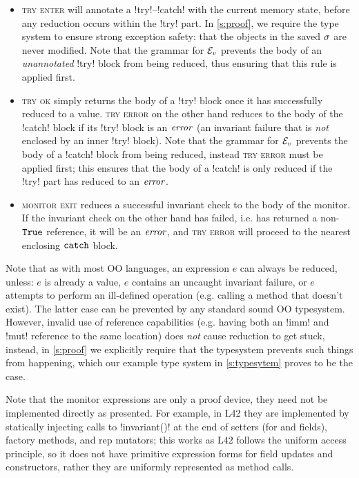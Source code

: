 \begin{itemize}
\item \textsc{try enter} will annotate a \Q!try!--\Q!catch! with the current memory state, before any reduction occurs within the \Q!try! part. In \ref{s:proof}, we require the type system to ensure strong exception safety: that the objects in the saved $\sigma$ are never modified. Note that the grammar for $\mathcal{E}_v{}$ prevents the body of an \emph{unannotated} \Q!try! block from being reduced, thus ensuring that this rule is applied first.

\item \textsc{try ok} simply returns the body of a \Q!try! block once it has successfully reduced to a value. \textsc{try error} on the other hand reduces to the body of the \Q!catch! block if its \Q!try! block is an $\mathit{error}$ (an invariant failure that is \emph{not} enclosed by an inner \Q!try! block). Note that the grammar for $\mathcal{E}_v{}$ prevents the body of a \Q!catch! block from being reduced, instead \textsc{try error} must be applied first; this ensures that the body of a \Q!catch! is only reduced if the \Q!try! part has reduced to an $\mathit{error}$.

\item \textsc{monitor exit} reduces a successful invariant check to the body of the monitor. If the invariant check on the other hand has failed, i.e. has returned a non-$\texttt{True}$ reference, it will be an $\mathit{error}$, and \textsc{try error} will proceed to the nearest enclosing $\texttt{catch}$ block.
\end{itemize}

Note that as with most OO languages, an expression $e$ can always be reduced, unless: $e$ is already a value, $e$ contains an uncaught invariant failure, or $e$ attempts to perform an ill-defined operation (e.g. calling a method that doesn't exist). The latter case can be prevented by any standard sound OO typesystem.
However, invalid use of reference capabilities (e.g. having both an \Q!imm! and \Q!mut! reference to the same location) does \emph{not} cause reduction to get stuck, instead, in \ref{s:proof} we explicitly require that the typesystem prevents such things from happening, which our example type system in \ref{s:typesytem} proves to be the case.

Note that the monitor expressions are only a proof device, they need not be implemented directly as presented.
For example, in L42 they are implemented by statically injecting calls to \Q!invariant()! at the end of setters (for \Q@imm@ and \Q@rep@ fields), factory methods, and rep mutators; this works as L42 follows the uniform access principle, so it does not have primitive expression forms for field updates and constructors, rather they are uniformly represented as method calls.


